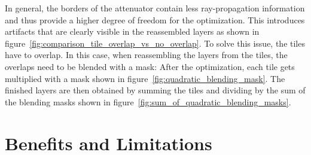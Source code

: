 In general, the borders of the attenuator contain less ray-propagation information and thus provide a higher degree of freedom for the optimization. 
This introduces artifacts that are clearly visible in the reassembled layers as shown in figure~\ref{fig:comparison_tile_overlap_vs_no_overlap}. 
To solve this issue, the tiles have to overlap. 
In this case, when reassembling the layers from the tiles, the overlaps need to be blended with a mask:
After the optimization, each tile gets multiplied with a mask shown in figure~\ref{fig:quadratic_blending_mask}. 
The finished layers are then obtained by summing the tiles and dividing by the sum of the blending masks shown in figure~\ref{fig:sum_of_quadratic_blending_masks}.

\section{Benefits and Limitations}
